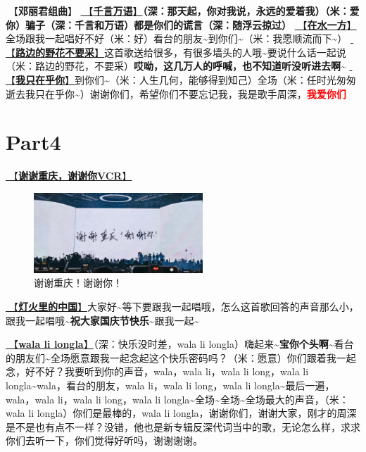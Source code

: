 \documentclass[]{ctexbook}
\begin{document}
🎵【\textbf{邓丽君组曲}】
\hyperref[thousands-of-words]{🎵【\textbf{千言万语}】}\textbf{（深：那天起，你对我说，永远的爱着我）（米：爱你）骗子（深：千言和万语）都是你们的谎言（深：随浮云掠过）} \hyperref[on-the-water-side]{🎵【\textbf{在水一方}】}全场跟我一起唱好不好（米：好）看台的朋友\textasciitilde 到你们\textasciitilde（米：我愿顺流而下\textasciitilde）
\hyperref[only-with-me]{🎵【\textbf{路边的野花不要采}】}这首歌送给很多，有很多墙头的人哦\textasciitilde 要说什么话一起说（米：路边的野花，不要采）\textbf{哎呦，这几万人的呼喊，也不知道听没听进去啊\textasciitilde{}}
\hyperref[only-you]{🎵【\textbf{我只在乎你}】}到你们\textasciitilde（米：人生几何，能够得到知己）全场（米：任时光匆匆逝去我只在乎你\textasciitilde）谢谢你们，希望你们不要忘记我，我是歌手周深，\textbf{\textcolor{red}{我爱你们~} }

\section{Part4}\label{chongqing-20241006-part4}

\hyperref[thank-you-vcr]{🎥【\textbf{谢谢重庆，谢谢你VCR}】}

\begin{figure}

{\centering \includegraphics[width=180pt]{img/chongqing20241006/thank-chongqing} 

}

\caption{谢谢重庆！谢谢你！}\label{fig:unnamed-chunk-96}
\end{figure}

\hyperref[China-in-the-light]{🎵【\textbf{灯火里的中国}】}大家好\textasciitilde 等下要跟我一起唱哦，怎么这首歌回答的声音那么小，跟我一起唱哦\textasciitilde{}\textbf{祝大家国庆节快乐\textasciitilde{}}跟我一起\textasciitilde{}

\hyperref[wala-li-longla]{🎵【\textbf{wala li longla}】}（深：快乐没时差，wala li longla）嗨起来\textasciitilde{}\textbf{宝你个头啊\textasciitilde{}}看台的朋友们\textasciitilde 全场愿意跟我一起念起这个快乐密码吗？（米：愿意）你们跟着我一起念，好不好？我要听到你的声音，wala，wala li，wala li long，wala li longla\textasciitilde wala，看台的朋友，wala li，wala li long，wala li longla\textasciitilde 最后一遍，wala，wala li，wala li long，wala li longla\textasciitilde 全场\textasciitilde 全场\textasciitilde 全场最大的声音，（米：wala li longla）你们是最棒的，wala li longla，谢谢你们，谢谢大家，刚才的周深是不是也有点不一样？没错，他也是新专辑反深代词当中的歌，无论怎么样，求求你们去听一下，你们觉得好听吗，谢谢谢谢。
\end{document}

